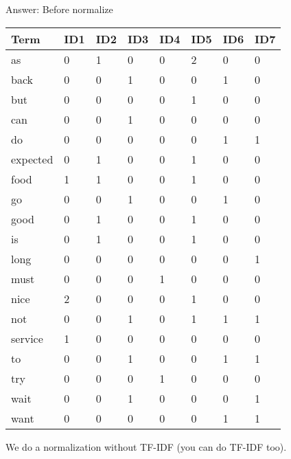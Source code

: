\documentclass[11pt,a4paper]{report}
\begin{document}
\begin{multicols*}{2}
\noindent Answer: Before normalize
\scriptsize
\begin{center}
\begin{tabular}{| l | l l l l l l l |}
\hline
Term     & ID1 & ID2 & ID3 & ID4 & ID5 & ID6 & ID7 \\ \hline
as       & 0   & 1   & 0   & 0   & 2   & 0   & 0   \\
back     & 0   & 0   & 1   & 0   & 0   & 1   & 0   \\
but      & 0   & 0   & 0   & 0   & 1   & 0   & 0   \\
can      & 0   & 0   & 1   & 0   & 0   & 0   & 0   \\
do       & 0   & 0   & 0   & 0   & 0   & 1   & 1   \\
expected & 0   & 1   & 0   & 0   & 1   & 0   & 0   \\
food     & 1   & 1   & 0   & 0   & 1   & 0   & 0   \\
go       & 0   & 0   & 1   & 0   & 0   & 1   & 0   \\
good     & 0   & 1   & 0   & 0   & 1   & 0   & 0   \\
is       & 0   & 1   & 0   & 0   & 1   & 0   & 0   \\
long     & 0   & 0   & 0   & 0   & 0   & 0   & 1   \\
must     & 0   & 0   & 0   & 1   & 0   & 0   & 0   \\
nice     & 2   & 0   & 0   & 0   & 1   & 0   & 0   \\
not      & 0   & 0   & 1   & 0   & 1   & 1   & 1   \\
service  & 1   & 0   & 0   & 0   & 0   & 0   & 0   \\
to       & 0   & 0   & 1   & 0   & 0   & 1   & 1   \\
try      & 0   & 0   & 0   & 1   & 0   & 0   & 0   \\
wait     & 0   & 0   & 1   & 0   & 0   & 0   & 1   \\
want     & 0   & 0   & 0   & 0   & 0   & 1   & 1   \\ \hline
\end{tabular}
\end{center}
\normalsize

\clearpage
\noindent We do a normalization without TF-IDF (you can do TF-IDF too). 


\end{multicols*}
\end{document}
